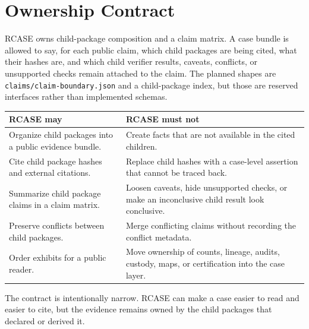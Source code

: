 \section{Ownership Contract}

RCASE owns child-package composition and a claim matrix. A case bundle is
allowed to say, for each public claim, which child packages are being cited,
what their hashes are, and which child verifier results, caveats, conflicts, or
unsupported checks remain attached to the claim. The planned shapes are
\texttt{claims/claim-boundary.json} and a child-package index, but those are
reserved interfaces rather than implemented schemas.

\begin{center}
\small
\begin{tabularx}{\textwidth}{XX}
\toprule
RCASE may & RCASE must not \\
\midrule
Organize child packages into a public evidence bundle. & Create facts that are
not available in the cited children. \\
Cite child package hashes and external citations. & Replace child hashes with a
case-level assertion that cannot be traced back. \\
Summarize child package claims in a claim matrix. & Loosen caveats, hide
unsupported checks, or make an inconclusive child result look conclusive. \\
Preserve conflicts between child packages. & Merge conflicting claims without
recording the conflict metadata. \\
Order exhibits for a public reader. & Move ownership of counts, lineage,
audits, custody, maps, or certification into the case layer. \\
\bottomrule
\end{tabularx}
\end{center}

The contract is intentionally narrow. RCASE can make a case easier to read and
easier to cite, but the evidence remains owned by the child packages that
declared or derived it.
